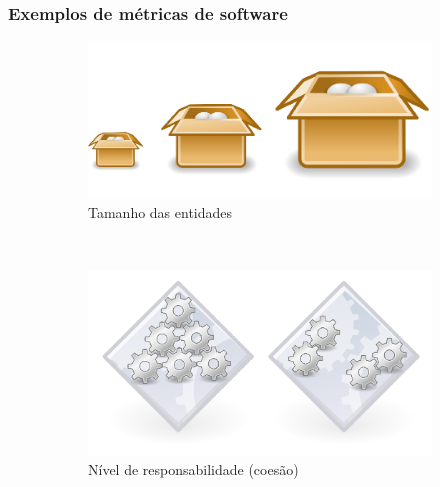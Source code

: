 \documentclass{beamer}
\begin{document}
\begin{frame}
\frametitle{Exemplos de métricas de software}
  

  \begin{figure}
        \begin{subfigure}[b]{0.3\textwidth}
      \includegraphics[width=\textwidth]{images/size.png}
                \caption*{Tamanho das entidades}
                
        \end{subfigure}\qquad\qquad\qquad\qquad\qquad%
        ~ %
        \begin{subfigure}[b]{0.3\textwidth}
      \includegraphics[width=\textwidth]{images/cohesion.png}
                \caption*{Nível de responsabilidade (coesão)}
        \end{subfigure}
        \begin{subfigure}[b]{0.3\textwidth}
      

\end{subfigure}
\end{figure}
\end{frame}
\end{document}
